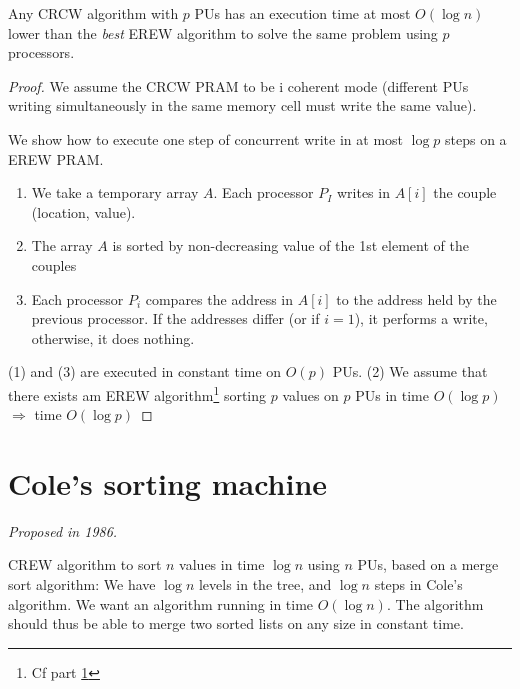 \begin{thm}
Any CRCW algorithm with $p$ PUs has an execution time at most $O(\log n)$ lower than the \emph{best} EREW algorithm to solve the same problem using $p$ processors.
\end{thm}

\begin{proof}
We assume the CRCW PRAM to be i coherent mode (different PUs writing simultaneously in the same memory cell must write the same value).

We show how to execute one step of concurrent write in at most $\log p$ steps on a EREW PRAM.


\begin{enumerate}
\item We take a temporary array $A$. Each processor $P_I$ writes in $A[i]$ the couple (location, value).
\item The array $A$ is sorted by non-decreasing value of the 1st element of the couples
\item Each processor $P_i$ compares the address in $A[i]$ to the address held by the previous processor. If the addresses differ (or if $i=1$), it performs a write, otherwise, it does nothing.
\end{enumerate}

 (1) and (3) are executed in constant time on $O(p)$ PUs. (2) We assume that there exists am EREW algorithm\footnote{Cf part \ref{sort_log}} sorting $p$ values on $p$ PUs in time $O(\log p)$ $\Rightarrow$ time $O(\log p)$
\end{proof}

\section{Cole's sorting machine}
\label{sort_log}
\textit{Proposed in 1986.}

CREW algorithm to sort $n$ values in time $\log n$ using $n$ PUs, based on a merge sort algorithm:
We have $\log n$ levels in the tree, and $\log n$ steps in Cole's algorithm.
We want an algorithm running in time $O(\log n)$. The algorithm should thus be able to merge two sorted lists on any size in constant time.



